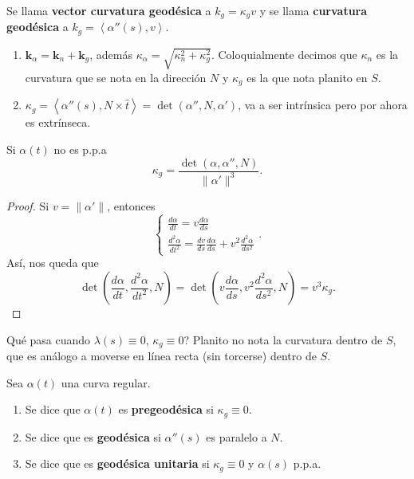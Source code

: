 \begin{definition}
Se llama \textbf{vector curvatura geodésica} a $\displaystyle k_{g}= \kappa_{g}v $ y se llama \textbf{curvatura geodésica} a $\displaystyle k_{g}=\left\langle \alpha''\left(s\right), v \right\rangle  $. 
\end{definition}
\begin{observation}
\begin{enumerate}
\item $\displaystyle \textbf{k} _{\alpha }= \textbf{k}_{n} + \textbf{k} _{g} $, además $\displaystyle \kappa_{\alpha }=\sqrt{\kappa_{n}^{2} + \kappa_{g}^{2}} $. Coloquialmente decimos que $\displaystyle \kappa_{n} $ es la curvatura que se nota en la dirección $\displaystyle N $ y $\displaystyle \kappa_{g} $ es la que nota planito en $\displaystyle S $. 
\item $\displaystyle \kappa_{g}=\left\langle \alpha''\left(s\right), N \times \hat{t} \right\rangle =\det\left(\alpha'', N, \alpha'\right) $, va a ser intrínsica pero por ahora es extrínseca. 
\end{enumerate}
\end{observation}
\begin{prop}
Si $\displaystyle \alpha \left(t\right) $ no es p.p.a
\[\kappa_{g}=\frac{\det\left(\alpha, \alpha'', N\right)}{\|\alpha'\|^{3}} .\]
\end{prop}
\begin{proof}
Si $\displaystyle v = \|\alpha'\| $, entonces
\[
\begin{cases}
\frac{d\alpha }{dt}=v\frac{d\alpha }{d s } \\
\frac{d ^{2}\alpha }{d t ^{2}}= \frac{dv}{d s}\frac{d\alpha }{d s}+v^{2}\frac{d ^{2}\alpha }{d s^{2}}
\end{cases}
.\]
Así, nos queda que 
\[\det\left(\frac{d\alpha }{d t}, \frac{d^{2}\alpha }{d t ^{2}}, N\right)=\det\left(v\frac{d\alpha }{d s}, v^{2}\frac{d^{2}\alpha }{d s^{2}}, N\right)=v^{3}\kappa_{g} .\]
\end{proof}
\begin{observation}
Qué pasa cuando $\displaystyle \lambda\left(s\right)\equiv 0 $, $\displaystyle \kappa_{g}\equiv 0 $? Planito no nota la curvatura dentro de $\displaystyle S $, que es análogo a moverse en línea recta (sin torcerse) dentro de $\displaystyle S $. 
\end{observation}
\begin{definition}
Sea $\displaystyle \alpha\left(t\right) $ una curva regular. 
\begin{enumerate}
\item Se dice que $\displaystyle \alpha\left(t\right) $ es \textbf{pregeodésica} si $\displaystyle \kappa_{g}\equiv 0 $.
\item Se dice que es \textbf{geodésica} si $\displaystyle \alpha''\left(s\right) $ es paralelo a $\displaystyle N $. 
\item Se dice que es \textbf{geodésica unitaria} si $\displaystyle \kappa_{g}\equiv 0 $ y $\displaystyle \alpha\left(s\right) $ p.p.a.
\end{enumerate}
\end{definition}
